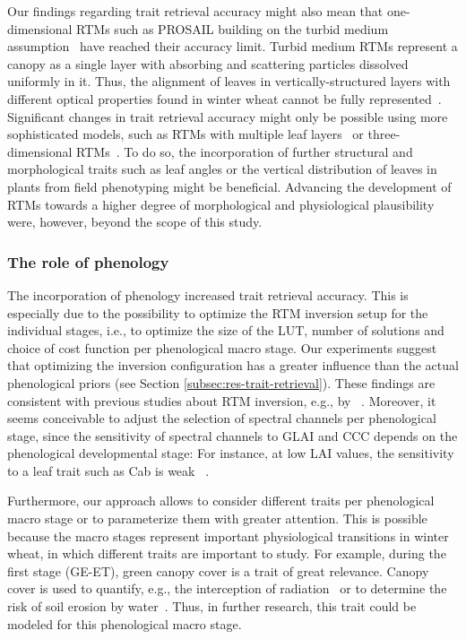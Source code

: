 Our findings regarding trait retrieval accuracy might also mean that one-dimensional \gls{RTM}s such as PROSAIL building on the turbid medium assumption~\citep{verhoef_light_1984} have reached their accuracy limit. Turbid medium \gls{RTM}s represent a canopy as a single layer with absorbing and scattering particles dissolved uniformly in it. Thus, the alignment of leaves in vertically-structured layers with different optical properties found in winter wheat cannot be fully represented~\citep{zhao_effect_2017}. Significant changes in trait retrieval accuracy might only be possible using more sophisticated models, such as \gls{RTM}s with multiple leaf layers~\citep{verhoef_coupled_2007} or three-dimensional RTMs~\citep{jiang_effective_2022}. To do so, the incorporation of further structural and morphological traits such as leaf angles or the vertical distribution of leaves in plants from field phenotyping might be beneficial. Advancing the development of \gls{RTM}s towards a higher degree of morphological and physiological plausibility were, however, beyond the scope of this study.

\subsubsection{The role of phenology}

The incorporation of phenology increased trait retrieval accuracy. This is especially due to the possibility to optimize the \gls{RTM} inversion setup for the individual stages, i.e., to optimize the size of the LUT, number of solutions and choice of cost function per phenological macro stage. Our experiments suggest that optimizing the inversion configuration has a greater influence than the actual phenological priors (see Section \ref{subsec:res-trait-retrieval}). These findings are consistent with previous studies about \gls{RTM} inversion, e.g., by ~\cite{verrelst_optimizing_2014}. Moreover, it seems conceivable to adjust the selection of spectral channels per phenological stage, since the sensitivity of spectral channels to \gls{GLAI} and \gls{CCC} depends on the phenological developmental stage: For instance, at low LAI values, the sensitivity to a leaf trait such as \gls{Cab} is weak ~\citep{verhoef_hyperspectral_2018}.

Furthermore, our approach allows to consider different traits per phenological macro stage or to parameterize them with greater attention. This is possible because the macro stages represent important physiological transitions in winter wheat, in which different traits are important to study. For example, during the first stage (GE-ET), green canopy cover is a trait of great relevance. Canopy cover is used to quantify, e.g., the interception of radiation~\citep{steven_foliage_1986} or to determine the risk of soil erosion by water~\citep{gabriels_assessment_2003}. Thus, in further research, this trait could be modeled for this phenological macro stage.

